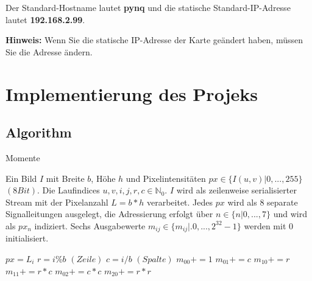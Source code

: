 \documentclass[a4paper]{report}
\begin{document}
Der Standard-Hostname lautet \textbf{pynq} und die statische Standard-IP-Adresse lautet \textbf{192.168.2.99}.

\textbf{Hinweis: } Wenn Sie die statische IP-Adresse der Karte geändert haben, müssen Sie die Adresse ändern. 



\chapter{Implementierung des Projeks}
\label{Implementierung_des_Projeks}

\section{Algorithm}
 
\begin{algorithm}
\caption{Momente}
\label{Momente}
\begin{algorithmic}[1]
\Require Ein Bild $I$ mit Breite {$b$}, Höhe {$h$} und Pixelintensitäten $px\in \{I(u,v)|0,...,255\}$ $(8Bit)$. Die Laufindices $u,v,i,j,r,c \in \mathbb{N}_0$. $I$ wird als zeilenweise serialisierter Stream mit der Pixelanzahl {$L=b*h$} verarbeitet. Jedes $px$ wird als 8 separate Signalleitungen ausgelegt, die Adressierung erfolgt über $n\in \{n|0,...,7\}$ und wird als $px_n$ indiziert. Sechs Ausgabewerte {$m_{ij}\in \{m_{ij}|.0,...,2^{32}-1\}$} werden mit 0 initialisiert.

	\State $px = L_i$
    	\State $r=i\%b$ $(Zeile)$
    	\State $c=i/b$  $(Spalte)$
      	\State $m_{00}+=1$    
	    \State $m_{01}+= c$ 
    	\State $m_{10}+= r$
    	\State $m_{11}+= r*c$
    	\State $m_{02}+= c*c$
    	\State $m_{20}+= r*r$
    \EndIf
\EndFor
\end{algorithmic}
\end{algorithm}
\end{document}
